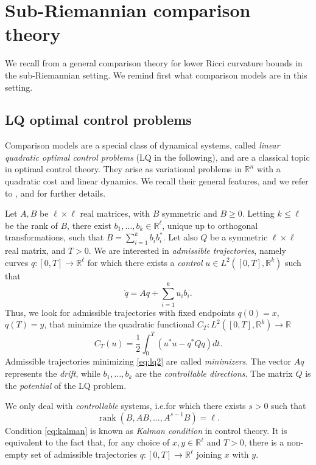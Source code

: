 \documentclass[11pt,a4paper]{article}
\theoremstyle{plain}
\theoremstyle{definition}
\theoremstyle{remark}
\numberwithin{equation}{section}
\newcommand{\R}{\mathbb{R}} %
\DeclareMathOperator{\rank}{\mathrm{rank}}
\begin{document}
\section{Sub-Riemannian comparison theory}\label{sec:comparison}

We recall from \cite{BRMathAnn} a general comparison theory for lower Ricci curvature bounds in the sub-Riemannian setting. We remind first what comparison models are in this setting.

\subsection{LQ optimal control problems}\label{sec:LQ}

Comparison models are a special class of dynamical systems, called \emph{linear quadratic optimal control problems} (LQ in the following), and are a classical topic in optimal control theory. They arise as variational problems in $\R^n$ with a quadratic cost and linear dynamics. We recall their general features, and we refer to \cite[Ch.\@ 16]{Agrachevbook}, \cite[Ch.\@ 1]{Coron} and \cite[Ch.\@ 7]{Jurdjevicbook} for further details.

Let $A,B$ be $\ell\times \ell$ real matrices, with $B$ symmetric and $B \geq 0$. Letting $k\leq \ell$ be the rank of $B$, there exist $b_1,\dots,b_k\in \R^\ell$, unique up to orthogonal transformations, such that $B = \sum_{i=1}^k b_i b_i^*$. Let also $Q$ be a symmetric $\ell\times \ell$ real matrix, and $T>0$. We are interested in \emph{admissible trajectories}, namely  curves $q:[0,T]\to \mathbb{R}^\ell$ for which there exists a \emph{control} $u \in L^2([0,T],\mathbb{R}^k)$ such that
\begin{equation}\label{eq:lq1}
\dot{q} = Aq + \sum_{i=1}^k u_i b_i.
\end{equation}
Thus, we look for admissible trajectories with fixed endpoints  $q(0)=x$,  $q(T)=y$, that minimize the quadratic functional $C_T: L^2([0,T],\mathbb{R}^k) \to \mathbb{R}$
\begin{equation}\label{eq:lq2}
C_T(u) = \frac{1}{2}\int_{0}^{T} \left(u^* u - q^*Qq \right)dt.
\end{equation}
Admissible trajectories minimizing \eqref{eq:lq2} are called \emph{minimizers}. The vector $Aq$ represents the \emph{drift}, while  $b_1,\dots,b_k$ are the \emph{controllable directions}. The matrix $Q$ is the \emph{potential} of the LQ problem.

We only deal with \emph{controllable} systems, i.e.\@ for which there exists $s >0$ such that
\begin{equation}\label{eq:kalman}
\rank(B,AB,\ldots,A^{s-1}B) = \ell.
\end{equation}
Condition \eqref{eq:kalman} is known as \emph{Kalman condition} in control theory. It is equivalent to the fact that, for any choice of $x,y\in \R^\ell$ and $T>0$, there is a non-empty set of admissible trajectories $q :[0,T] \to \R^\ell$ joining $x$ with $y$.
\end{document}
